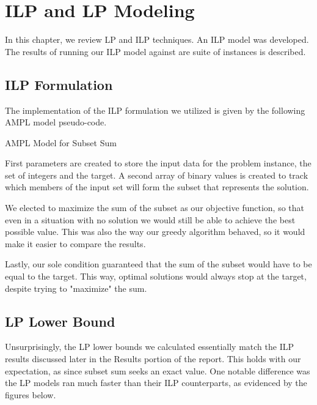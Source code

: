 \documentclass{report}
\begin{document}
\chapter{ILP and LP Modeling}
In this chapter, we review LP and ILP techniques. An ILP model was developed. The results of running our ILP model against are suite of instances is described.

\section{ILP Formulation}
The implementation of the ILP formulation we utilized is given by the following AMPL model pseudo-code.

\begin{algorithm}
  \caption{AMPL Model for Subset Sum}
  \label{Model}
  \begin{algorithmic}
     
     
    \STATE{}
    \ENSURE{}
    \STATE{}
    \REQUIRE{}
  \end{algorithmic}
\end{algorithm}

First parameters are created to store the input data for the problem instance, the set of integers and 
the target. A second array of binary values is created to track which members of the input set will form 
the subset that represents the solution.

We elected to maximize the sum of the subset as our objective function, so that even in a situation 
with no solution we would still be able to achieve the best possible value. This was also the way our 
greedy algorithm behaved, so it would make it easier to compare the results.

Lastly, our sole condition guaranteed that the sum of the subset would have to be equal to the target. 
This way, optimal solutions would always stop at the target, despite trying to "maximize" the sum.

\section{LP Lower Bound}
Unsurprisingly, the LP lower bounds we calculated essentially match the ILP results discussed later 
in the Results portion of the report. This holds with our expectation, as since subset sum seeks an 
exact value. One notable difference was the LP models ran much faster than their ILP counterparts, as 
evidenced by the figures below.
\end{document}
